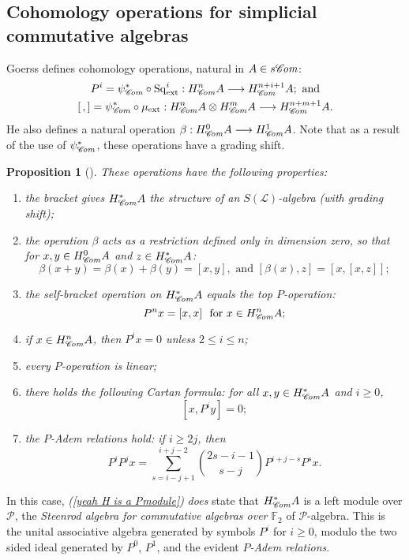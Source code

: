 \documentclass[11pt]{amsart} \renewcommand{\baselinestretch}{1.2}
\theoremstyle{plain}
\newtheorem{prop}[thm]{Proposition}
\numberwithin{equation}{section} %
\theoremstyle{plain}
\newtheorem{prop}[thm]{Proposition}
\numberwithin{equation}{chapter} %
\renewcommand{\to}{\longrightarrow}
\newcommand{\scrL}{\mathscr{L}}
\newcommand{\scrC}{\mathscr{C}}
\newcommand{\calP}{\mathcal{P}}
\newcommand{\citeBOX}[2][]{\cite[\mbox{#1}]{#2}}
\newcommand{\Palg}{{\calP}}
\newcommand{\LieOperad}{{\scrL}}
\newcommand{\ExtCohOp}{\mathrm{Sq}_\mathrm{ext}}
\newcommand{\ExtCohProd}{\mu_\mathrm{ext}}
\newcommand{\F}{\mathbb{F}}
\newcommand{\algs}{{\scrC\!\textit{\normalfont\textit{om}}}}
\newcommand{\Ftwo}{\F_2}
\newcommand{\SubsectionOrSection}[1]{\subsection{#1}}
\begin{document}
\begin{Constructing cohomology operations}
\SubsectionOrSection{Cohomology operations for simplicial commutative algebras}
\label{The example of simplicial commutative F2-algebras}
Goerss \citeBOX[\S5]{MR1089001} defines cohomology operations, natural in $A\in s \algs$:
\begin{gather*}
P^i=\psi^*_{\algs}\circ\ExtCohOp^i:H^n_{\algs}A\to H_{\algs}^{n+i+1}A;\textup{ and}\\
[\,,]=\psi^*_{\algs}\circ\ExtCohProd :H_{\algs}^nA\otimes H_{\algs}^mA\to H_{\algs}^{n+m+1}A.
\end{gather*}
He also defines a natural operation $\beta:H_{\algs}^0A\to H_{\algs}^1A$. Note that as a result of the use of $\psi^*_{\algs}$, these operations have a grading shift.
\begin{prop}[{\citeBOX[\S5]{MR1089001}}]
\label{omnibus on coh of simp algs}These operations have the following properties:
\begin{enumerate}
\item the bracket gives $H^*_{\algs}A$ the structure of an $S(\LieOperad)$-algebra (with grading shift);
\item the operation $\beta$ acts as a restriction defined only in dimension zero, so that for $x,y\in H^0_{\algs}A$ and $z\in H^*_{\algs}A$:
\[\beta(x+y)=\beta(x)+\beta(y)=[x,y],\text{\ \ and \ }[\beta(x),z]=[x,[x,z]];\]
\item the self-bracket operation on $H^*_{\algs}A$ equals the \emph{top $P$-operation}:
\[P^nx=[x,x]\text{\ \ for $x\in H^n_{\algs}A$};\]
\item \label{P unstable vanishing} if $x\in H^n_{\algs}A$, then $P^ix=0$ unless $2\leq i\leq n$;
\item every $P$-operation is linear;
\item there holds the following \emph{Cartan formula}:  for all $x,y\in   H^*_{\algs}A$ and $i\geq0$,
\[[x,P^iy]=0;\]
\item \label{yeah H is a Pmodule}the \emph{$P$-Adem relations} hold: if $i\geq 2j$, then
\[P^iP^jx=\sum_{s=i-j+1}^{i+j-2}\binom{2s-i-1}{ s-j}P^{i+j-s}P^sx.\]
\end{enumerate}
\end{prop}
In this case, \emph{(\ref{yeah H is a Pmodule})} \emph{does} state that $H^*_{\algs}A$ is a left module over $\Palg$, the \emph{Steenrod algebra for commutative algebras over $\Ftwo $} of $\Palg$-algebra. This is the unital associative algebra generated by symbols $P^i$ for $i\geq0$, modulo the two sided ideal generated by $P^0$, $P^1$, and the evident \emph{$P$-Adem relations}.



\end{Constructing cohomology operations}
\end{document}
